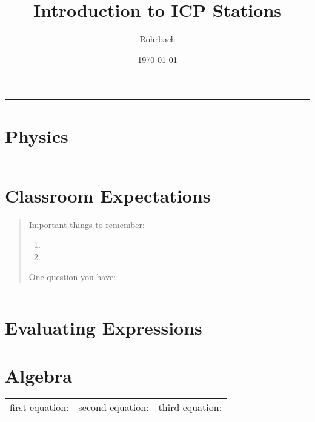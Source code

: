 \documentclass[10pt]{exam}
\title{Introduction to ICP Stations}
\author{Rohrbach}
\date{\today}
\begin{document}
\maketitle
\vspace{1em}

\hrule

\section{Physics}

\vs[2]

\hrule

\vspace{1em}

\section{Classroom Expectations}

\begin{quote}
Important things to remember:


\begin{enumerate}
\item 
\item \vs
\end{enumerate}
\vs

\noindent One question you have:
\vs

\end{quote}

\hrule

\section{Evaluating Expressions}


\begin{center}
\end{center}

\vspace{1em}

\pagebreak

\section{Algebra}

\begin{center}
	\begin{tabular}
		{ m{} | m{}| m{} } 
		first equation: & second equation: & third equation:  \\[20em]
	\end{tabular}
\end{center}
\end{document}
